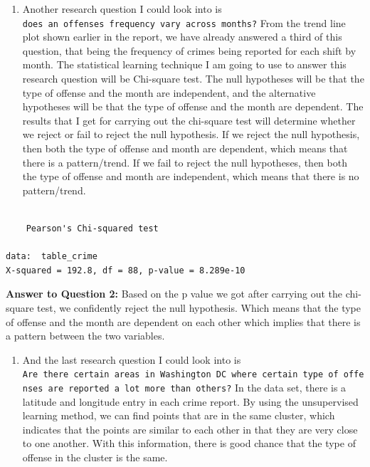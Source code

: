 \documentclass[
]{article}
\providecommand{\tightlist}{%
  \setlength{\itemsep}{0pt}\setlength{\parskip}{0pt}}
\begin{document}
\begin{enumerate}
\def\labelenumi{\arabic{enumi}.}
\setcounter{enumi}{1}
\tightlist
\item
  Another research question I could look into is
  \texttt{does\ an\ offense\textquotesingle{}s\ frequency\ vary\ across\ months?}
  From the trend line plot shown earlier in the report, we have already
  answered a third of this question, that being the frequency of crimes
  being reported for each shift by month. The statistical learning
  technique I am going to use to answer this research question will be
  Chi-square test. The null hypotheses will be that the type of offense
  and the month are independent, and the alternative hypotheses will be
  that the type of offense and the month are dependent. The results that
  I get for carrying out the chi-square test will determine whether we
  reject or fail to reject the null hypothesis. If we reject the null
  hypothesis, then both the type of offense and month are dependent,
  which means that there is a pattern/trend. If we fail to reject the
  null hypotheses, then both the type of offense and month are
  independent, which means that there is no pattern/trend.
\end{enumerate}

\begin{verbatim}

    Pearson's Chi-squared test

data:  table_crime
X-squared = 192.8, df = 88, p-value = 8.289e-10
\end{verbatim}

\textbf{Answer to Question 2:} Based on the p value we got after
carrying out the chi-square test, we confidently reject the null
hypothesis. Which means that the type of offense and the month are
dependent on each other which implies that there is a pattern between
the two variables.

\begin{enumerate}
\def\labelenumi{\arabic{enumi}.}
\setcounter{enumi}{2}
\tightlist
\item
  And the last research question I could look into is
  \texttt{Are\ there\ certain\ areas\ in\ Washington\ DC\ where\ certain\ type\ of\ offenses\ are\ reported\ a\ lot\ more\ than\ others?}
  In the data set, there is a latitude and longitude entry in each crime
  report. By using the unsupervised learning method, we can find points
  that are in the same cluster, which indicates that the points are
  similar to each other in that they are very close to one another. With
  this information, there is good chance that the type of offense in the
  cluster is the same.
\end{enumerate}
\end{document}
